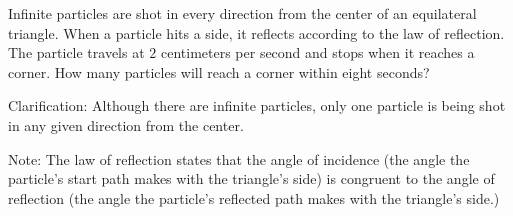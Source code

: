 Infinite particles are shot in every direction from the center of an equilateral triangle. When a particle hits a side, it reflects according to the law of reflection. The particle travels at $2$ centimeters per second and stops when it reaches a corner. How many particles will reach a corner within eight seconds?



Clarification: Although there are infinite particles, only one particle is being shot in any given direction from the center.



Note: The law of reflection states that the angle of incidence (the angle the particle's start path makes with the triangle's side) is congruent to the angle of reflection (the angle the particle's reflected path makes with the triangle's side.)
